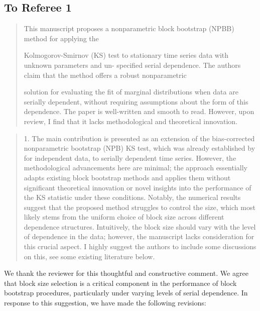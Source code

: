\documentclass[12pt]{article}
\newenvironment{comment}%
{\begin{quotation}\noindent\small\it\color{darkblue}\ignorespaces%
}{\end{quotation}}
\begin{document}
\subsection*{To Referee 1}

\begin{comment}
This manuscript proposes a nonparametric block bootstrap (NPBB) method for applying the

Kolmogorov-Smirnov (KS) test to stationary time series data with unknown parameters and un-
specified serial dependence. The authors claim that the method offers a robust nonparametric

solution for evaluating the fit of marginal distributions when data are serially dependent, without
requiring assumptions about the form of this dependence. The paper is well-written and smooth
to read. However, upon review, I find that it lacks methodological and theoretical innovation.
\end{comment}

\begin{comment}
1. The main contribution is presented as an extension of the bias-corrected 
nonparametric
bootstrap (NPB) KS test, which was already established by 
\citet{babu2004goodness}
for independent data, to serially dependent time series. However, the 
methodological advancements
here are minimal; the approach essentially adapts existing block bootstrap 
methods and applies them without significant theoretical innovation or novel 
insights into the performance
of the KS statistic under these conditions. Notably, the numerical results 
suggest that the
proposed method struggles to control the size, which most likely stems from the 
uniform
choice of block size across different dependence structures. Intuitively, the 
block size should
vary with the level of dependence in the data; however, the manuscript lacks 
consideration
for this crucial aspect. I highly suggest the authors to include some 
discussions on this, see
some existing literature below.

\citet{hall1995blocking}

\citet{lahiri1999theoretical}

\citet{buhlmann2002bootstraps}

\citet{politis2004automatic}

\citet{lahiri2013resampling}

\end{comment}

We thank the reviewer for this thoughtful and constructive comment. 
We agree that block size selection is a critical component in the 
performance of block bootstrap procedures, particularly under varying 
levels of serial dependence. In response to this suggestion, we have 
made the following revisions:
\end{document}

